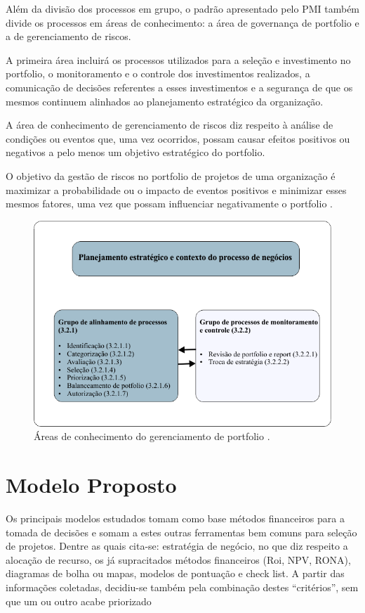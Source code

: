 \documentclass[12pt,a4paper,ruledheader,tocpage=prefix,floatnumber=continuous,pagestart=folhaderosto,font=times]{abnt}
\begin{document}
Além da divisão dos processos em grupo, o padrão apresentado pelo PMI também divide os processos em áreas de conhecimento: a área de governança de 
portfolio e a de gerenciamento de riscos.

A primeira área incluirá os processos utilizados para a seleção e investimento no portfolio, o monitoramento e o controle dos investimentos realizados, 
a comunicação de decisões referentes a esses investimentos e a segurança de que os mesmos continuem alinhados ao planejamento estratégico da organização.

A área de conhecimento de gerenciamento de riscos diz respeito à análise de condições ou eventos que, uma vez ocorridos, possam causar efeitos positivos 
ou negativos a pelo menos um objetivo estratégico do portfolio. 

O objetivo da gestão de riscos no portfolio de projetos de uma organização é maximizar a probabilidade ou o impacto de eventos positivos e minimizar 
esses mesmos fatores, uma vez que possam influenciar negativamente o portfolio \cite{SPPM2008}.

\begin{figure}[H]
\centering
\includegraphics[width=.7\textwidth]{img/fig12.png}
\caption{Áreas de conhecimento do gerenciamento de portfolio \cite{SPPM2008}.}
\end{figure}

\section{Modelo Proposto}
Os principais modelos estudados tomam como base métodos financeiros para a tomada de decisões e somam a estes outras ferramentas bem comuns para seleção 
de projetos. Dentre as quais cita-se: estratégia de negócio, no que diz respeito a alocação de recurso, os já supracitados métodos financeiros (Roi, NPV,
RONA), diagramas de bolha ou mapas, modelos de pontuação e check list. A partir das informações coletadas, decidiu-se também pela combinação destes 
``critérios'', sem que um ou outro acabe priorizado\cite{RODRIGUES2011}
\end{document}
